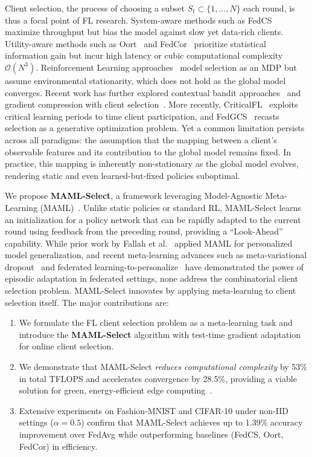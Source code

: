 \documentclass[journal]{IEEEtran}
\begin{document}
Client selection, the process of choosing a subset $S_t \subset \{1, \ldots, N\}$ each round, is thus a focal point of FL research. System-aware methods such as FedCS~\cite{nishio2019client} maximize throughput but bias the model against slow yet data-rich clients. Utility-aware methods such as Oort~\cite{lai2021oort} and FedCor~\cite{tang2022fedcor} prioritize statistical information gain but incur high latency or cubic computational complexity $\mathcal{O}(N^3)$. Reinforcement Learning approaches~\cite{wang2020optimizing} model selection as an MDP but assume environmental stationarity, which does not hold as the global model converges. Recent work has further explored contextual bandit approaches~\cite{pan2024contextual} and gradient compression with client selection~\cite{xu2024federated}. More recently, CriticalFL~\cite{yan2023criticalfl} exploits critical learning periods to time client participation, and FedGCS~\cite{ning2024fedgcs} recasts selection as a generative optimization problem. Yet a common limitation persists across all paradigms: the assumption that the mapping between a client's observable features and its contribution to the global model remains fixed. In practice, this mapping is inherently non-stationary as the global model evolves, rendering static and even learned-but-fixed policies suboptimal.

We propose \textbf{MAML-Select}, a framework leveraging Model-Agnostic Meta-Learning (MAML)~\cite{finn2017model}. Unlike static policies or standard RL, MAML-Select learns an initialization for a policy network that can be rapidly adapted to the current round using feedback from the preceding round, providing a ``Look-Ahead'' capability. While prior work by Fallah et al.~\cite{fallah2020personalized} applied MAML for personalized model generalization, and recent meta-learning advances such as meta-variational dropout~\cite{jeon2023metavd} and federated learning-to-personalize~\cite{lee2023fedl2p} have demonstrated the power of episodic adaptation in federated settings, none address the combinatorial client selection problem. MAML-Select innovates by applying meta-learning to client selection itself. The major contributions are:
\begin{enumerate}
	\item We formulate the FL client selection problem as a meta-learning task and introduce the \textbf{MAML-Select} algorithm with test-time gradient adaptation for online client selection.
	\item We demonstrate that MAML-Select \textit{reduces computational complexity} by 53\% in total TFLOPS and accelerates convergence by 28.5\%, providing a viable solution for green, energy-efficient edge computing~\cite{yang2021energy}.
	\item Extensive experiments on Fashion-MNIST and CIFAR-10 under non-IID settings ($\alpha = 0.5$) confirm that MAML-Select achieves up to 1.39\% accuracy improvement over FedAvg while outperforming baselines (FedCS, Oort, FedCor) in efficiency.
\end{enumerate}
\end{document}

